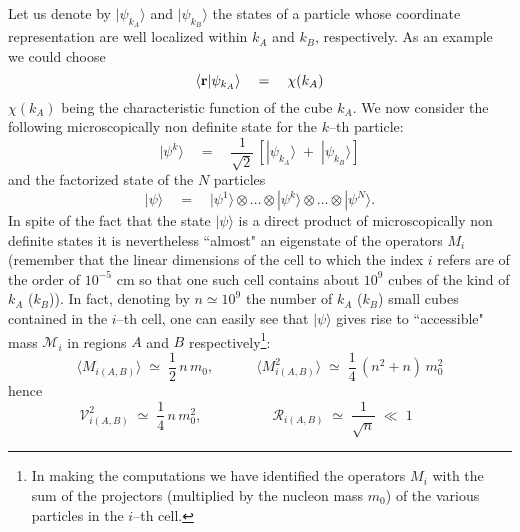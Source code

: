 \documentclass[10pt,a4paper]{article}
\begin{document}
Let us denote by $|\psi_{k_{A}}\rangle$ and $|\psi_{k_{B}}\rangle$
the states of a particle whose coordinate representation are well
localized within $k_{A}$ and $k_{B}$, respectively. As an example
we could choose
\begin{equation}
\langle{\bf r}|\psi_{k_{A}}\rangle \quad = \quad \chi(k_{A})
\end{equation}
$\chi(k_{A})$  being the characteristic function of the cube $k_{A}$.
We now consider the following microscopically non definite state
for the $k$--th particle:
\begin{equation} \label{ge1}
|\psi^{k}\rangle \quad = \quad \frac{1}{\sqrt{2}}\, \left[
|\psi_{k_{A}}\rangle \; + \; |\psi_{k_{B}}\rangle \right]
\end{equation}
and the factorized state of the $N$ particles
\begin{equation} \label{ge2}
|\psi\rangle \quad  =\quad |\psi^{1}\rangle\otimes\ldots \otimes
|\psi^{k}\rangle \otimes\ldots\otimes |\psi^{N}\rangle.
\end{equation}
In spite of the fact that the state $|\psi\rangle$ is a direct
product of microscopically non definite states it is nevertheless
``almost" an eigenstate of the operators $M_{i}$ (remember that
the linear dimensions of the cell to which the index $i$ refers
are of the order of $10^{-5}$ cm so that one such cell contains
about $10^{9}$ cubes of the kind of $k_{A}$ ($k_{B}$)). In fact,
denoting by $n \simeq 10^{9}$  the number of $k_{A}$ ($k_{B}$)
small cubes contained in the $i$--th cell, one can easily see that
$|\psi\rangle$ gives rise to ``accessible" mass ${\mathcal M}_{i}$
in regions $A$ and $B$ respectively\footnote{In making the
computations we have identified the operators $M_{i}$ with the sum
of the projectors (multiplied by the nucleon mass $m_{0}$) of the
various particles in the $i$--th cell.}:
\begin{equation}
\langle M_{i(A,B)} \rangle \; \simeq \; \frac{1}{2}\, n \, m_{0},
\qquad\quad \langle M^{2}_{i(A,B)} \rangle \; \simeq \;
\frac{1}{4}\, (n^{2} + n)\, m^{2}_{0}
\end{equation}
hence
\begin{equation}
{\mathcal V}^{2}_{i(A,B)} \; \simeq \; \frac{1}{4}\, n \,
m^{2}_{0}, \qquad\quad\qquad {\mathcal R}_{i(A,B)} \; \simeq \;
\frac{1}{\sqrt{n}} \; \ll \; 1 \qquad
\end{equation}
\end{document}
